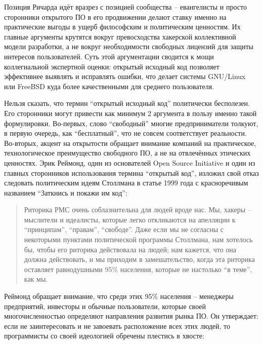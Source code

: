 Позиция Ричарда идёт вразрез с позицией сообщества -- евангелисты и просто сторонники открытого ПО в его продвижении делают ставку именно на практические выгоды в ущерб философским и политическим ценностям. Их главные аргументы крутятся вокруг превосходства хакерской коллективной модели разработки, а не вокруг необходимости свободных лицензий для защиты интересов пользователей. Суть этой аргументации сводится к мощи коллегиальной экспертной оценки: открытый исходный код позволяет эффективнее выявлять и исправлять ошибки, что делает системы GNU/Linux или FreeBSD куда более качественными для среднего пользователя.

Нельзя сказать, что термин \enquote{открытый исходный код} политически бесполезен. Его сторонники могут привести как минимум 2 аргумента в пользу именно такой формулировки. Во-первых, слово \enquote{свободный} многие предприниматели толкуют, в первую очередь, как \enquote{бесплатный}, что не совсем соответствует реальности. Во-вторых, акцент на открытости обращает внимание компаний на практическое, технологическое преимущество свободного ПО, а не на отвлечённых этических ценностях. Эрик Реймонд, один из основателей Open Source Initiative и один из главных сторонников использования термина \enquote{открытый код}, изложил свой отказ следовать политическим идеям Столлмана в статье 1999 года с красноречивым названием \enquote{Заткнись и покажи им код}:

\begin{quote}
Риторика РМС очень соблазнительна для людей вроде нас. Мы, хакеры -- мыслители и идеалисты, которые легко откликаются на апелляции к \enquote{принципам}, \enquote{правам}, \enquote{свободе}. Даже если мы не согласны с некоторыми пунктами политической программы Столлмана, нам хотелось бы, чтобы его риторика действовала на людей; нам кажется, что она должна действовать, и мы приходим в замешательство, когда эта риторика оставляет равнодушными 95\% населения, которые не настолько \enquote{в теме}, как мы. 
\end{quote}

Реймонд обращает внимание, что среди этих 95\% населения -- менеджеры предприятий, инвесторы и обычные пользователи, которые своей многочисленностью определяют направления развития рынка ПО. Он утверждает: если не заинтересовать и не завоевать расположение всех этих людей, то программисты со своей идеологией обречены плестись в хвосте:


